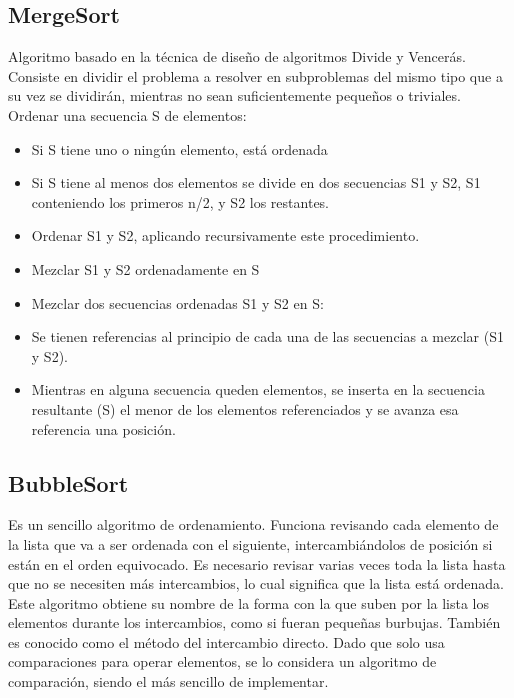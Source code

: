 \documentclass[11pt,letterpaper]{report}
\begin{document}
\subsection*{MergeSort}
Algoritmo basado en la técnica de diseño de algoritmos Divide y Vencerás. Consiste en dividir el problema a resolver en subproblemas del mismo tipo que a su vez se dividirán, mientras no sean suficientemente pequeños o triviales.
Ordenar una secuencia S de elementos:
\begin{itemize}
\item Si S tiene uno o ningún elemento, está ordenada
\item Si S tiene al menos dos elementos se divide en dos secuencias S1 y S2, S1 conteniendo los primeros n/2, y S2 los restantes.
\item Ordenar S1 y S2, aplicando recursivamente este procedimiento.
\item Mezclar S1 y S2 ordenadamente en S
\item Mezclar dos secuencias ordenadas S1 y S2 en S:
\item Se tienen referencias al principio de cada una de las secuencias a mezclar (S1 y S2).
\item Mientras en alguna secuencia queden elementos, se inserta en la secuencia resultante (S) el menor de los elementos referenciados y se avanza esa referencia una posici\' on.
\end{itemize}
\subsection*{BubbleSort}
Es un sencillo algoritmo de ordenamiento. Funciona revisando cada elemento de la lista que va a ser ordenada con el siguiente, intercambiándolos de posici\' on si están en el orden equivocado.
Es necesario revisar varias veces toda la lista hasta que no se necesiten más intercambios, lo cual significa que la lista está ordenada. Este algoritmo obtiene su nombre de la forma con la que suben por la lista los elementos durante los intercambios, como si fueran pequeñas burbujas.
También es conocido como el método del intercambio directo. Dado que solo usa comparaciones para operar elementos, se lo considera un algoritmo de comparaci\' on, siendo el más sencillo de implementar.
\newpage
\end{document}
